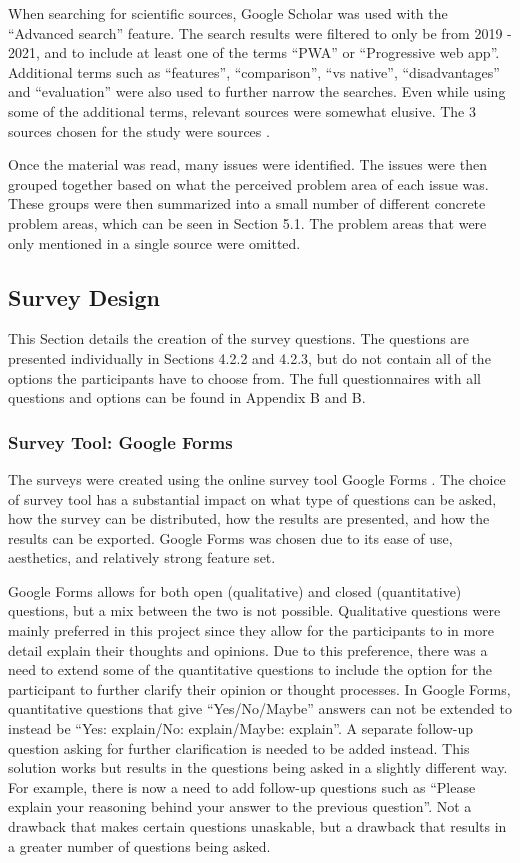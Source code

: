 \documentclass[a4paper,12pt]{article}
\begin{document}
When searching for scientific sources, Google Scholar was used with the “Advanced search” feature. The search results were filtered to only be from 2019 - 2021, and to include at least one of the terms “PWA” or “Progressive web app”. Additional terms such as “features”, “comparison”, “vs native”, “disadvantages” and “evaluation” were also used to further narrow the searches. Even while using some of the additional terms, relevant sources were somewhat elusive. The 3 sources chosen for the study were sources \cite{dawning_of_pwa, pwa_in_modern_webdeb, pwa_unified}.

Once the material was read, many issues were identified. The issues were then grouped together based on what the perceived problem area of each issue was. These groups were then summarized into a small number of different concrete problem areas, which can be seen in Section 5.1. The problem areas that were only mentioned in a single source were omitted.

\subsection{Survey Design}
This Section details the creation of the survey questions. The questions are presented individually in Sections 4.2.2 and 4.2.3, but do not contain all of the options the participants have to choose from. The full questionnaires with all questions and options can be found in Appendix B and B.

\subsubsection{Survey Tool: Google Forms}
The surveys were created using the online survey tool Google Forms \cite{google_forms}. The choice of survey tool has a substantial impact on what type of questions can be asked, how the survey can be distributed, how the results are presented, and how the results can be exported. Google Forms was chosen due to its ease of use, aesthetics, and relatively strong feature set.

Google Forms allows for both open (qualitative) and closed (quantitative) questions, but a mix between the two is not possible. Qualitative questions were mainly preferred in this project since they allow for the participants to in more detail explain their thoughts and opinions. Due to this preference, there was a need to extend some of the quantitative questions to include the option for the participant to further clarify their opinion or thought processes. In Google Forms, quantitative questions that give “Yes/No/Maybe” answers can not be extended to instead be “Yes: explain/No: explain/Maybe: explain”. A separate follow-up question asking for further clarification is needed to be added instead. This solution works but results in the questions being asked in a slightly different way. For example, there is now a need to add follow-up questions such as “Please explain your reasoning behind your answer to the previous question”. Not a drawback that makes certain questions unaskable, but a drawback that results in a greater number of questions being asked.
\end{document}
